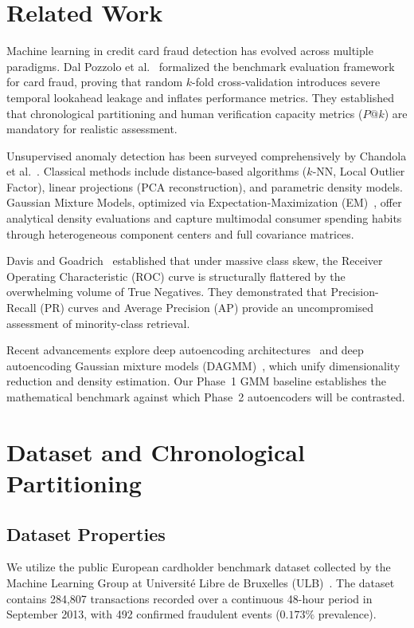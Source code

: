 \documentclass[10pt,journal,compsoc]{IEEEtran}
\begin{document}
\section{Related Work}
Machine learning in credit card fraud detection has evolved across multiple paradigms. Dal Pozzolo et al.~\cite{dalpozzolo2015calibrating, dalpozzolo2018credit} formalized the benchmark evaluation framework for card fraud, proving that random $k$-fold cross-validation introduces severe temporal lookahead leakage and inflates performance metrics. They established that chronological partitioning and human verification capacity metrics ($P@k$) are mandatory for realistic assessment.

Unsupervised anomaly detection has been surveyed comprehensively by Chandola et al.~\cite{chandola2009anomaly}. Classical methods include distance-based algorithms ($k$-NN, Local Outlier Factor), linear projections (PCA reconstruction), and parametric density models. Gaussian Mixture Models, optimized via Expectation-Maximization (EM)~\cite{bishop2006pattern}, offer analytical density evaluations and capture multimodal consumer spending habits through heterogeneous component centers and full covariance matrices.

Davis and Goadrich~\cite{davis2006relationship} established that under massive class skew, the Receiver Operating Characteristic (ROC) curve is structurally flattered by the overwhelming volume of True Negatives. They demonstrated that Precision-Recall (PR) curves and Average Precision (AP) provide an uncompromised assessment of minority-class retrieval.

Recent advancements explore deep autoencoding architectures~\cite{sakurada2014anomaly} and deep autoencoding Gaussian mixture models (DAGMM)~\cite{zong2018deep}, which unify dimensionality reduction and density estimation. Our Phase~1 GMM baseline establishes the mathematical benchmark against which Phase~2 autoencoders will be contrasted.

\section{Dataset and Chronological Partitioning}
\subsection{Dataset Properties}
We utilize the public European cardholder benchmark dataset collected by the Machine Learning Group at Universit{\'e} Libre de Bruxelles (ULB)~\cite{dalpozzolo2015calibrating}. The dataset contains 284,807 transactions recorded over a continuous 48-hour period in September 2013, with 492 confirmed fraudulent events ($0.173\%$ prevalence).
\end{document}
